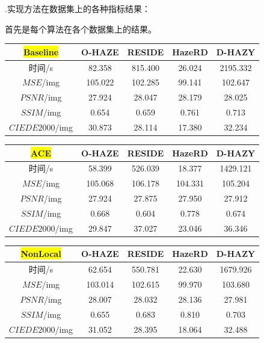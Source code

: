 \documentclass[12pt]{article}
\begin{document}
\begin{large}
    .实现方法在数据集上的各种指标结果：\par
\end{large}
首先是每个算法在各个数据集上的结果。
\begin{table}[h]
\centering
\begin{tabular}{ccccc} %
\toprule 
\colorbox{yellow}{Baseline} & O-HAZE & RESIDE  & HazeRD & D-HAZY\\
\midrule
时间/s & 82.358 	& 815.400 & 26.024 	 & 2195.332  \\
$MSE$/img & 105.022  & 102.285 &  	99.141  &	102.647 \\
$PSNR$/img & 27.924 	&28.047 	&28.179 	&28.025 
 \\
$SSIM$/img & 0.654 	& 0.659 	&0.761 	&0.713 \\
$CIEDE2000$/img  & 30.873 	&28.114 &	17.380 &	32.234  
\\
\bottomrule 
\end{tabular}
\end{table}\par
\begin{table}[h]
\centering
\begin{tabular}{ccccc} %
\toprule 
\colorbox{yellow}{ACE} & O-HAZE & RESIDE  & HazeRD & D-HAZY \\ 
\midrule
时间/s & 58.399 	&526.039 	&18.377 	&1429.121 
 \\
$MSE$/img & 105.068 	&106.178 	&104.331 	&105.204 
 \\
$PSNR$/img &27.924 	& 27.875 	&27.950 	&27.912 
 \\
$SSIM$/img & 0.668 	& 0.604 	& 0.778 	&0.674 
\\
$CIEDE2000$/img  &29.847 	&37.027 	&23.046 	&36.346 	\\
\bottomrule 
\end{tabular}
\end{table}\par
\begin{table}[h]
\centering
\begin{tabular}{ccccc} %
\toprule 
\colorbox{yellow}{NonLocal} & O-HAZE & RESIDE  & HazeRD & D-HAZY \\ 
\midrule
时间/s & 62.654 	&550.781 	&22.630 	&1679.926 
  \\
$MSE$/img & 103.014 	&102.615 	&99.970 	&103.680 
 \\
$PSNR$/img & 28.007 	&28.032 	&28.136 	&27.981 
 \\
$SSIM$/img & 0.655 	&0.683 	&0.810 &	0.703 
\\
$CIEDE2000$/img  & 31.052 &	28.395& 	18.064 	&32.488 \\
\bottomrule 
\end{tabular}
\end{table}\par
\end{document}
